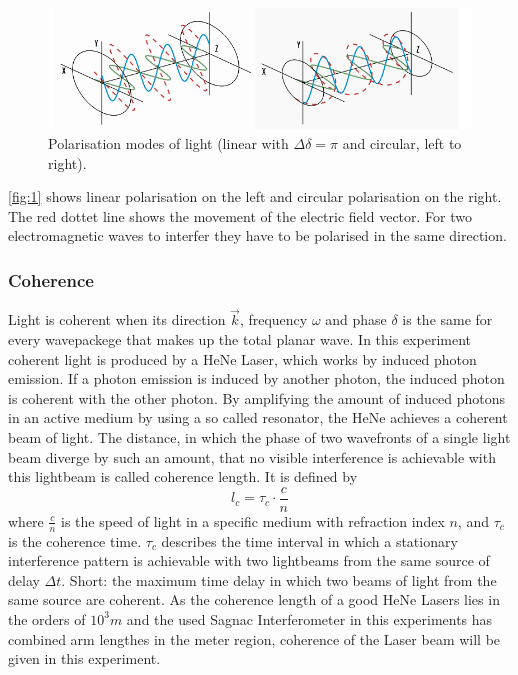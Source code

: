 \begin{figure}[H]
    \centering
    \includegraphics[width=.8\linewidth]{polar.pdf}
    \caption{Polarisation modes of light (linear with $\Delta \delta = \pi$ and circular, left to right). \cite{polarisation}}
    \label{fig:1}
\end{figure}
\noindent
\autoref{fig:1} shows linear polarisation on the left and circular polarisation on the right. The red dottet line shows the movement of the electric field vector. 
For two electromagnetic waves to interfer they have to be polarised in the same direction. 
\subsubsection{Coherence}
Light is coherent when its direction $\vec{k}$, frequency $\omega$ and phase $\delta$ is the same for every wavepackege that makes up the total planar wave. In this experiment coherent light is produced by a HeNe Laser, which works by induced photon emission. If a photon emission is induced by another photon, the induced photon is coherent with the other photon. By 
amplifying the amount of induced photons in an active medium by using a so called resonator, the HeNe achieves a coherent beam of light. The distance, in which the phase of two wavefronts of a single light beam diverge by such an amount, that no visible interference is achievable with this lightbeam is called coherence length. It is defined by 
\begin{equation}
    l_c = \tau_c \cdot \frac{c}{n}
\end{equation}
where $\frac{c}{n}$ is the speed of light in a specific medium with refraction index $n$, and $\tau_c$ is the coherence time. $\tau_c$ describes the time interval in which a stationary interference pattern is achievable with two lightbeams from the same source of delay $\Delta t$. Short: the maximum time delay in which two beams of light from the same source are coherent. 
As the coherence length of a good HeNe Lasers lies in the orders of $10^3 m$ and the used Sagnac Interferometer in this experiments has combined arm lengthes in the meter region, coherence of the Laser beam will be given in this experiment.
